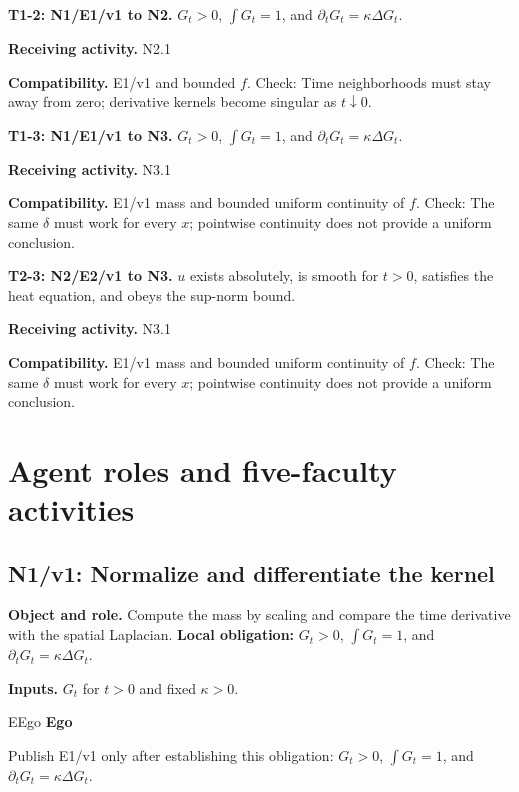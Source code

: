 \documentclass[preprint,12pt,aps,pra,showkeys,amsmath,amssymb,superscriptaddress,floatfix]{revtex4-2}
\theoremstyle{definition}
\theoremstyle{remark}
\newcommand{\mmfaculty}[3]{%
 \begin{mmfacultybox}{#1}{#2}
 {\sffamily\bfseries\color{MMBlue}#2}\par\smallskip #3
 \end{mmfacultybox}}
\newcommand{\field}[2]{\par\smallskip\noindent\textbf{#1.} #2\par}
\begin{document}
\begingroup\small\linespread{1.05}\selectfont

\field{T1-2: N1/E1/v1 to N2}{\(G_t>0\), \(\int G_t=1\), and \(\partial_tG_t=\kappa\Delta G_t\).}

\field{Receiving activity}{N2.1}

\field{Compatibility}{E1/v1 and bounded \(f\). Check: Time neighborhoods must stay away from
zero; derivative kernels become singular as \(t\downarrow0\).}

\field{T1-3: N1/E1/v1 to N3}{\(G_t>0\), \(\int G_t=1\), and \(\partial_tG_t=\kappa\Delta G_t\).}

\field{Receiving activity}{N3.1}

\field{Compatibility}{E1/v1 mass and bounded uniform continuity of \(f\). Check: The same
\(\delta\) must work for every \(x\); pointwise continuity does not
provide a uniform conclusion.}

\field{T2-3: N2/E2/v1 to N3}{\(u\) exists absolutely, is smooth for \(t>0\), satisfies the heat
equation, and obeys the sup-norm bound.}

\field{Receiving activity}{N3.1}

\field{Compatibility}{E1/v1 mass and bounded uniform continuity of \(f\). Check: The same
\(\delta\) must work for every \(x\); pointwise continuity does not
provide a uniform conclusion.}

\endgroup

\clearpage\section{Agent roles and five-faculty activities}\begingroup\small\linespread{1.05}\selectfont{}

\subsection{N1/v1: Normalize and differentiate the kernel}

\field{Object and role}{Compute the mass by scaling and compare the time derivative with the
spatial Laplacian. \textbf{Local obligation:} \(G_t>0\), \(\int G_t=1\),
and \(\partial_tG_t=\kappa\Delta G_t\).}

\field{Inputs}{\(G_t\) for \(t>0\) and fixed \(\kappa>0\).}

\mmfaculty{E}{Ego}{Publish E1/v1 only after establishing this obligation: \(G_t>0\),
\(\int G_t=1\), and \(\partial_tG_t=\kappa\Delta G_t\).}
\end{document}
